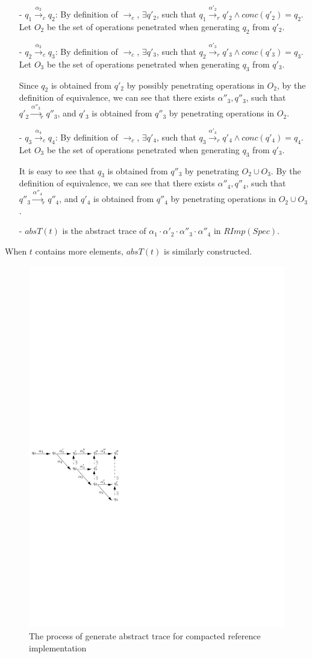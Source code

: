 \begin{itemize}
\setlength{\itemsep}{0.5pt}
\item[-] $q_1 {\xrightarrow{\alpha_2}}_c q_2$: By definition of $\rightarrow_c$, $\exists q'_2$, such that $q_1 {\xrightarrow{\alpha'_2}}_r q'_2 \wedge conc(q'_2)=q_2$. Let $O_2$ be the set of operations penetrated when generating $q_2$ from $q'_2$.

\item[-] $q_2 {\xrightarrow{\alpha_3}}_c q_3$: By definition of $\rightarrow_c$, $\exists q'_3$, such that $q_2 {\xrightarrow{\alpha'_3}}_r q'_3 \wedge conc(q'_3)=q_3$. Let $O_3$ be the set of operations penetrated when generating $q_3$ from $q'_3$.

Since $q_2$ is obtained from $q'_2$ by possibly penetrating operations in $O_2$, by the definition of equivalence, we can see that there exists $\alpha''_3, q''_3$, such that $q'_2 {\xrightarrow{\alpha''_3}}_r q''_3$, and $q'_3$ is obtained from $q''_3$ by penetrating operations in $O_2$.

\item[-] $q_3 {\xrightarrow{\alpha_4}}_c q_4$: By definition of $\rightarrow_c$, $\exists q'_4$, such that $q_3 {\xrightarrow{\alpha'_4}}_r q'_4 \wedge conc(q'_4)=q_4$. Let $O_3$ be the set of operations penetrated when generating $q_3$ from $q'_3$.

It is easy to see that $q_3$ is obtained from $q''_3$ by penetrating $O_2 \cup O_3$. By the definition of equivalence, we can see that there exists $\alpha''_4,q''_4$, such that $q''_3 {\xrightarrow{\alpha''_4}}_r q''_4$, and $q'_4$ is obtained from $q''_4$ by penetrating operations in $O_2 \cup O_3$.

\item[-] $absT(t)$ is the abstract trace of $\alpha_1 \cdot \alpha'_2 \cdot \alpha''_3 \cdot \alpha''_4$ in $RImp(Spec)$.
\end{itemize}

When $t$ contains more elements, $absT(t)$ is similarly constructed.

\begin{figure}[t]
  \centering
  \includegraphics[width=0.4 \textwidth]{figures/PIC-Generate-AbstractTrace-Compact.pdf}
  \caption{The process of generate abstract trace for compacted reference implementation}
  \label{fig:the process of generate abstract trace for compacted reference implementation}
\end{figure}


